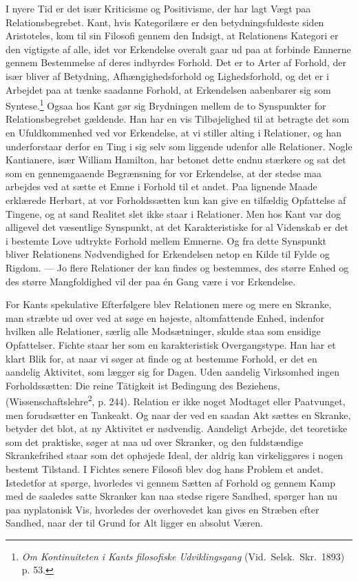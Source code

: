 \documentclass[12pt]{article}
\newcommand{\opage}[1]{\marginnote{\footnotesize\textit{[#1]}}}
\begin{document}
I nyere Tid er det især Kriticisme og Positivisme, der har lagt Vægt paa
Relationsbegrebet. Kant, hvis Kategorilære er den betydningsfuldeste siden
Aristoteles, kom til sin Filosofi gennem den Indsigt, at Relationens Kategori
er den vigtigste af alle, idet vor Erkendelse overalt gaar ud paa at forbinde
Emnerne gennem Bestemmelse af deres indbyrdes Forhold. Det er to Arter af
Forhold, der især bliver af Betydning, Afhængighedsforhold og
Lighedsforhold, og det er i Arbejdet paa at tænke saadanne Forhold, at
Erkendelsen aabenbarer sig som
Syntese.\footnote{\textit{Om Kontinuiteten i Kants filosofiske
Udviklingsgang} (Vid.\ Selsk.\ Skr.\ 1893) p. 53.} Ogsaa hos Kant gør sig
Brydningen mellem de to Synspunkter for Relationsbegrebet gældende. Han har en
vis Tilbøjelighed til at betragte det som en Ufuldkommenhed ved vor
Erkendelse, at vi stiller alting i Relationer, og han underforstaar derfor en
\guillemotright Ting i sig selv\guillemotleft{} som liggende udenfor alle
Relationer. Nogle Kantianere, især William Hamilton, har betonet dette endnu
stærkere og sat det som en gennemgaaende Begrænsning for vor Erkendelse, at
der stedse maa arbejdes ved at sætte et Emne i Forhold til et andet. Paa
lignende Maade erklærede Herbart, at vor Forholdssætten kun kan give en
tilfældig Opfattelse af Tingene, og at sand Realitet slet ikke staar i
Relationer. Men hos Kant var dog alligevel det væsentlige Synspunkt, at det
Karakteristiske for al Videnskab er det i bestemte Love udtrykte Forhold
mellem Emnerne. Og fra dette Synspunkt bliver Relationens Nødvendighed for
Erkendelsen netop en Kilde til Fylde og Rigdom. --- Jo flere Relationer der
kan findes
\opage{11} og bestemmes, des større Enhed og des større Mangfoldighed vil der paa én Gang
være i vor Erkendelse.

For Kants spekulative Efterfølgere blev Relationen mere og mere en Skranke,
man stræbte ud over ved at søge en højeste, altomfattende Enhed, indenfor
hvilken alle Relationer, særlig alle Modsætninger, skulde staa som ensidige
Opfattelser. Fichte staar her som en karakteristisk Overgangstype. Han har et
klart Blik for, at naar vi søger at finde og at bestemme Forhold, er det en
aandelig Aktivitet, som lægger sig for Dagen. Uden aandelig Virksomhed ingen
Forholdssætten: \guillemotright Die reine Tätigkeit ist Bedingung des
Beziehens,\guillemotleft{} (Wissenschaftslehre\textsuperscript{2}, p. 244).
Relation er ikke noget Modtaget eller Paatvunget, men forudsætter en Tankeakt.
Og naar der ved en saadan Akt sættes en Skranke, betyder det blot, at ny
Aktivitet er nødvendig. Aandeligt Arbejde, det teoretiske som det praktiske,
søger at naa ud over Skranker, og den fuldstændige Skrankefrihed staar som det
ophøjede Ideal, der aldrig kan virkeliggøres i nogen bestemt Tilstand. I
Fichtes senere Filosofi blev dog hans Problem et andet. Istedetfor at spørge,
hvorledes vi gennem Sætten af Forhold og gennem Kamp med de saaledes satte
Skranker kan naa stedse rigere Sandhed, spørger han nu paa nyplatonisk Vis,
hvorledes der overhovedet kan gives en Stræben efter Sandhed, naar der til
Grund for Alt ligger en absolut Væren.
\end{document}
